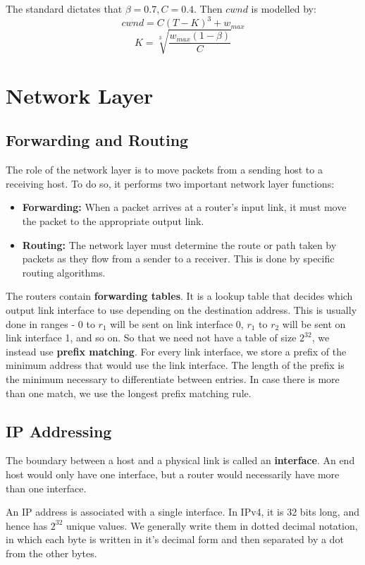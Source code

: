 \documentclass[12pt,letterpaper]{book}
\theoremstyle{definition}
\begin{document}
The standard dictates that $\beta = 0.7, C = 0.4$. Then $cwnd$ is modelled by:
\[cwnd = C(T-K)^3 + w_{max}\]
\[K = \sqrt[3]{\frac{w_{max} (1 - \beta)}{C}}\]

\chapter{Network Layer}

\section{Forwarding and Routing} 

The role of the network layer is to move packets from a sending host to a receiving host. To do so, it performs two important network layer functions:

\begin{itemize}
  \item \textbf{Forwarding:} When a packet arrives at a router's input link, it must move the packet to the appropriate output link.

  \item \textbf{Routing:} The network layer must determine the route or path taken by packets as they flow from a sender to a receiver. This is done by specific routing algorithms.
\end{itemize}

The routers contain \textbf{forwarding tables}. It is a lookup table that decides which output link interface to use depending on the destination address. This is usually done in ranges - 0 to $r_1$ will be sent on link interface 0, $r_1$ to $r_2$ will be sent on link interface 1, and so on. So that we need not have a table of size $2^{32}$, we instead use \textbf{prefix matching}. For every link interface, we store a prefix of the minimum address that would use the link interface. The length of the prefix is the minimum necessary to differentiate between entries. In case there is more than one match, we use the longest prefix matching rule.

\section{IP Addressing}

The boundary between a host and a physical link is called an \textbf{interface}. An end host would only have one interface, but a router would necessarily have more than one interface.

An IP address is associated with a single interface. In IPv4, it is 32 bits long, and hence has $2^{32}$ unique values. We generally write them in dotted decimal notation, in which each byte is written in it's decimal form and then separated by a dot from the other bytes.
\end{document}
